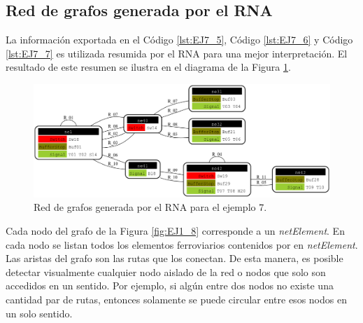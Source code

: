 \subsection{Red de grafos generada por el RNA}

	La información exportada en el Código \ref{lst:EJ7_5}, Código \ref{lst:EJ7_6} y Código \ref{lst:EJ7_7} es utilizada resumida por el RNA para una mejor interpretación. El resultado de este resumen se ilustra en el diagrama de la Figura \ref{fig:EJ7_8}.

	\begin{figure}[H]
		\centering
		\includegraphics[width=1\textwidth]{Figuras/Graph_7}
		\centering\caption{Red de grafos generada por el RNA para el ejemplo 7.}
		\label{fig:EJ7_8}
	\end{figure}
	
	Cada nodo del grafo de la Figura \ref{fig:EJ1_8} corresponde a un \textit{netElement}. En cada nodo se listan todos los elementos ferroviarios contenidos por en \textit{netElement}. Las aristas del grafo son las rutas que los conectan. De esta manera, es posible detectar visualmente cualquier nodo aislado de la red o nodos que solo son accedidos en un sentido. Por ejemplo, si algún entre dos nodos no existe una cantidad par de rutas, entonces solamente se puede circular entre esos nodos en un solo sentido.